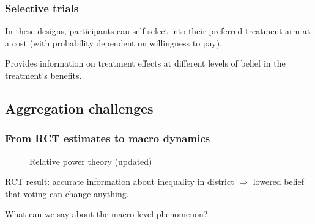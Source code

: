 \documentclass[12pt,english,dvipsnames,aspectratio=169,handout]{beamer}\usepackage[]{graphicx}\usepackage[]{xcolor}
\begin{document}
\begin{frame}
	\frametitle{Selective trials}
	In these designs, participants can self-select into their preferred treatment arm at a cost (with probability dependent on willingness to pay).\bigskip
	\pause
	
	Provides information on treatment effects at different levels of belief in the treatment's benefits.
	
\end{frame}

\subsection{Aggregation challenges}

\begin{frame}
	\frametitle{From RCT estimates to macro dynamics}
	
	\begin{figure}
		\centering
		\caption{Relative power theory (updated)}
	\end{figure}\pause

	RCT result: accurate information about inequality in district $\Rightarrow$ lowered belief that voting can change anything.\pause
	
	What can we say about the macro-level phenomenon?
	
\end{frame}
\end{document}

